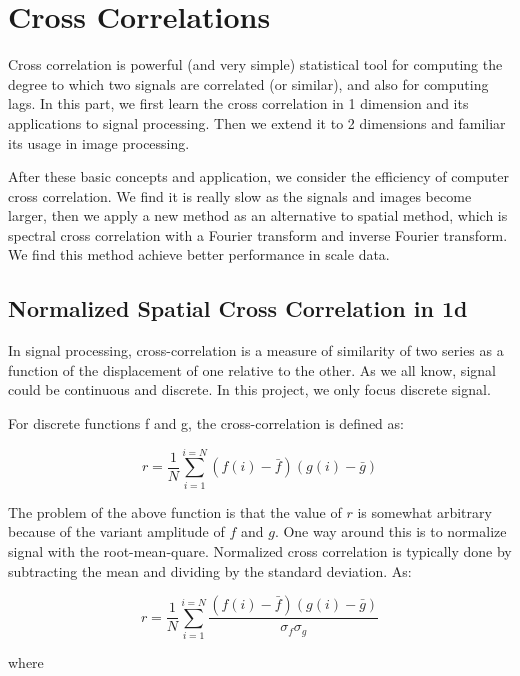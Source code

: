 \chapter{Cross Correlations}\label{part: cross correlations}

Cross correlation is powerful (and very simple) statistical tool for computing the degree to which two signals are correlated (or similar), and also for computing lags. In this part, we first learn the cross correlation in 1 dimension and its applications to signal processing. Then we extend it to 2 dimensions and familiar its usage in image processing. 

After these basic concepts and application, we consider the efficiency of computer cross correlation. We find it is really slow as the signals and images become larger, then we apply a new method as an alternative to spatial method, which is spectral cross correlation with a Fourier transform and inverse Fourier transform. We find this method achieve better performance in scale data.

\section{Normalized Spatial Cross Correlation in 1d}

In signal processing, cross-correlation is a measure of similarity of two series as a function of the displacement of one relative to the other. As we all know, signal could be continuous and discrete. In this project, we only focus discrete signal. 

For discrete functions f and g, the cross-correlation is defined as:

\begin{equation*}
r=\frac{1}{N}
\sum_{i=1}^{i=N}(f(i)-\bar{f})(g(i)-\bar{g})
\end{equation*}

The problem of the above function is that the value of $r$ is somewhat arbitrary because of the variant amplitude of $f$ and $g$. One way around this is to normalize signal with the root-mean-quare. Normalized cross correlation is typically done by subtracting the mean and dividing by the standard deviation. As:

\begin{equation*}
r=\frac{1}{N}
\sum_{i=1}^{i=N}
\frac{(f(i)-\bar{f})(g(i)-\bar{g})}{\sigma _{f}\sigma _{g}}
\end{equation*}

where

